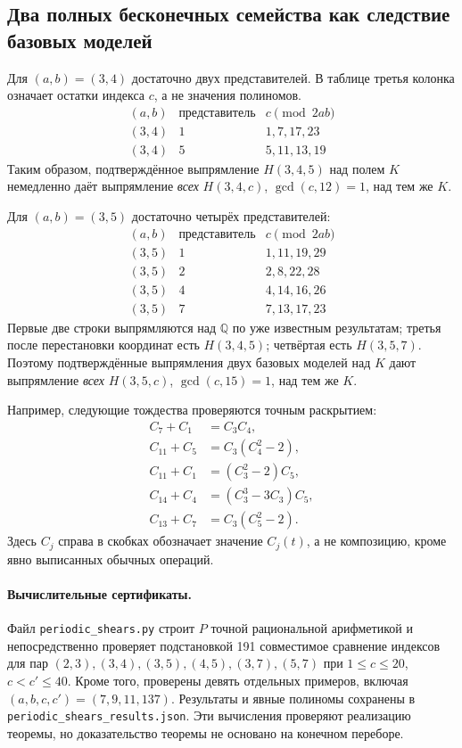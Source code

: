 \subsection{Два полных бесконечных семейства как следствие базовых моделей}

Для $(a,b)=(3,4)$ достаточно двух представителей. В таблице
третья колонка означает остатки индекса $c$, а не значения полиномов.
\[
\begin{array}{c|c|l}
 (a,b)&\text{представитель}&c\pmod{2ab}\\\hline
 (3,4)&1&1,7,17,23\\
 (3,4)&5&5,11,13,19
\end{array}
\]
Таким образом, подтверждённое выпрямление $H(3,4,5)$ над полем $K$
немедленно даёт выпрямление \emph{всех} $H(3,4,c)$,
$\gcd(c,12)=1$, над тем же $K$.

Для $(a,b)=(3,5)$ достаточно четырёх представителей:
\[
\begin{array}{c|c|l}
 (a,b)&\text{представитель}&c\pmod{2ab}\\\hline
 (3,5)&1&1,11,19,29\\
 (3,5)&2&2,8,22,28\\
 (3,5)&4&4,14,16,26\\
 (3,5)&7&7,13,17,23
\end{array}
\]
Первые две строки выпрямляются над $\mathbb Q$ по уже известным результатам;
третья после перестановки координат есть $H(3,4,5)$;
четвёртая есть $H(3,5,7)$.
Поэтому подтверждённые выпрямления двух базовых моделей над $K$
дают выпрямление \emph{всех} $H(3,5,c)$,
$\gcd(c,15)=1$, над тем же $K$.

Например, следующие тождества проверяются точным раскрытием:
\[
\begin{aligned}
 C_7+C_1&=C_3C_4,\\
 C_{11}+C_5&=C_3(C_4^2-2),\\
 C_{11}+C_1&=(C_3^2-2)C_5,\\
 C_{14}+C_4&=(C_3^3-3C_3)C_5,\\
 C_{13}+C_7&=C_3(C_5^2-2).
\end{aligned}
\]
Здесь $C_j$ справа в скобках обозначает значение $C_j(t)$,
а не композицию, кроме явно выписанных обычных операций.

\paragraph{Вычислительные сертификаты.}
Файл \texttt{periodic\_shears.py} строит $P$ точной рациональной
арифметикой и непосредственно проверяет подстановкой 191 совместимое
сравнение индексов для пар
$(2,3),(3,4),(3,5),(4,5),(3,7),(5,7)$ при
$1\leq c\leq20$, $c<c'\leq40$.
Кроме того, проверены девять отдельных примеров, включая
$(a,b,c,c')=(7,9,11,137)$.
Результаты и явные полиномы сохранены в
\texttt{periodic\_shears\_results.json}.
Эти вычисления проверяют реализацию теоремы, но доказательство
теоремы не основано на конечном переборе.

